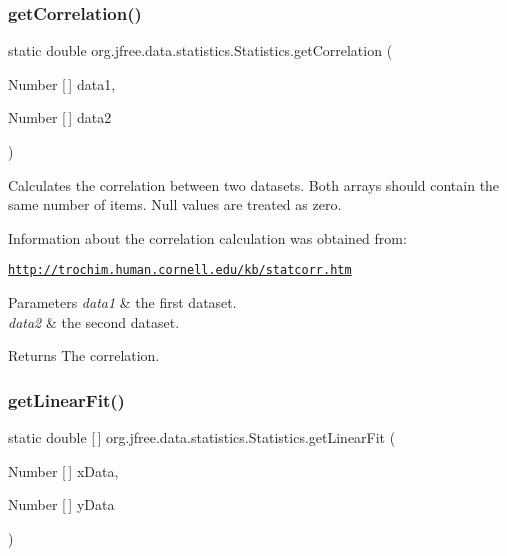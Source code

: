 \subsubsection{\texorpdfstring{get\+Correlation()}{getCorrelation()}}
{\footnotesize\ttfamily static double org.\+jfree.\+data.\+statistics.\+Statistics.\+get\+Correlation (\begin{DoxyParamCaption}\item[{Number \mbox{[}$\,$\mbox{]}}]{data1,  }\item[{Number \mbox{[}$\,$\mbox{]}}]{data2 }\end{DoxyParamCaption})\hspace{0.3cm}{\ttfamily [static]}}

Calculates the correlation between two datasets. Both arrays should contain the same number of items. Null values are treated as zero. 

Information about the correlation calculation was obtained from\+:

\href{http://trochim.human.cornell.edu/kb/statcorr.htm}{\tt http\+://trochim.\+human.\+cornell.\+edu/kb/statcorr.\+htm}


\begin{DoxyParams}{Parameters}
{\em data1} & the first dataset. \\
\hline
{\em data2} & the second dataset.\\
\hline
\end{DoxyParams}
\begin{DoxyReturn}{Returns}
The correlation. 
\end{DoxyReturn}
\mbox{\label{classorg_1_1jfree_1_1data_1_1statistics_1_1_statistics_a710851304d13d6c83f0b6c799da5b94b}} 
\subsubsection{\texorpdfstring{get\+Linear\+Fit()}{getLinearFit()}}
{\footnotesize\ttfamily static double \mbox{[}$\,$\mbox{]} org.\+jfree.\+data.\+statistics.\+Statistics.\+get\+Linear\+Fit (\begin{DoxyParamCaption}\item[{Number \mbox{[}$\,$\mbox{]}}]{x\+Data,  }\item[{Number \mbox{[}$\,$\mbox{]}}]{y\+Data }\end{DoxyParamCaption})\hspace{0.3cm}{\ttfamily [static]}}

